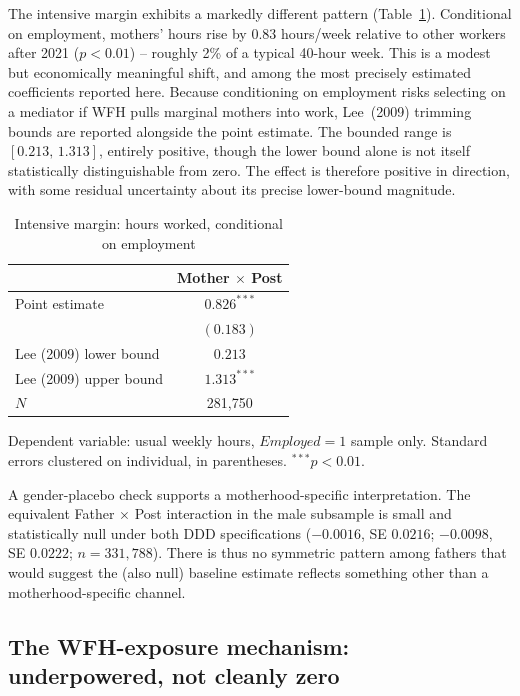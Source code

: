 \documentclass[11pt]{article}
\begin{document}
The intensive margin exhibits a markedly different pattern (Table~\ref{tab:intensive}). Conditional on employment, mothers' hours rise by $0.83$ hours/week relative to other workers after 2021 ($p<0.01$) -- roughly 2\% of a typical 40-hour week. This is a modest but economically meaningful shift, and among the most precisely estimated coefficients reported here. Because conditioning on employment risks selecting on a mediator if WFH pulls marginal mothers into work, Lee~(2009) trimming bounds are reported alongside the point estimate. The bounded range is $[0.213,\,1.313]$, entirely positive, though the lower bound alone is not itself statistically distinguishable from zero. The effect is therefore positive in direction, with some residual uncertainty about its precise lower-bound magnitude.

\begin{table}[htbp]
\centering
\caption{Intensive margin: hours worked, conditional on employment}
\label{tab:intensive}
\begin{tabular}{lc}
\hline
 & Mother $\times$ Post \\
\hline
Point estimate & $0.826^{***}$ \\
 & $(0.183)$ \\
Lee (2009) lower bound & $0.213$ \\
Lee (2009) upper bound & $1.313^{***}$ \\
\hline
$N$ & 281{,}750 \\
\hline
\end{tabular}
\par\smallskip
{\footnotesize Dependent variable: usual weekly hours, $Employed=1$ sample only. Standard errors clustered on individual, in parentheses. $^{***}p<0.01$.}
\end{table}

A gender-placebo check supports a motherhood-specific interpretation. The equivalent Father $\times$ Post interaction in the male subsample is small and statistically null under both DDD specifications ($-0.0016$, SE $0.0216$; $-0.0098$, SE $0.0222$; $n=331{,}788$). There is thus no symmetric pattern among fathers that would suggest the (also null) baseline estimate reflects something other than a motherhood-specific channel.

\subsection{The WFH-exposure mechanism: underpowered, not cleanly zero}
\end{document}
